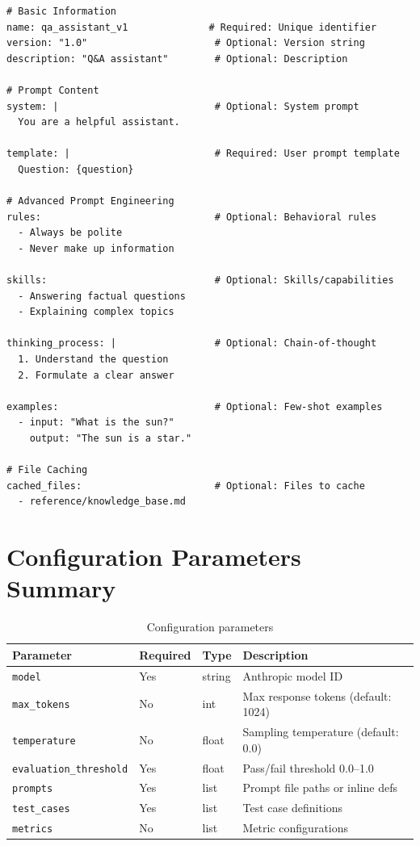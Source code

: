 \documentclass[11pt,a4paper]{report}
\begin{document}
\begin{lstlisting}[style=yaml,title={prompts/<name>.yaml}]
# Basic Information
name: qa_assistant_v1              # Required: Unique identifier
version: "1.0"                      # Optional: Version string
description: "Q&A assistant"        # Optional: Description

# Prompt Content
system: |                           # Optional: System prompt
  You are a helpful assistant.

template: |                         # Required: User prompt template
  Question: {question}

# Advanced Prompt Engineering
rules:                              # Optional: Behavioral rules
  - Always be polite
  - Never make up information

skills:                             # Optional: Skills/capabilities
  - Answering factual questions
  - Explaining complex topics

thinking_process: |                 # Optional: Chain-of-thought
  1. Understand the question
  2. Formulate a clear answer

examples:                           # Optional: Few-shot examples
  - input: "What is the sun?"
    output: "The sun is a star."

# File Caching
cached_files:                       # Optional: Files to cache
  - reference/knowledge_base.md
\end{lstlisting}

\section{Configuration Parameters Summary}

\begin{table}[h]
\centering
\begin{tabular}{@{}lllp{5cm}@{}}
\toprule
\textbf{Parameter} & \textbf{Required} & \textbf{Type} & \textbf{Description} \\
\midrule
\texttt{model} & Yes & string & Anthropic model ID \\
\texttt{max\_tokens} & No & int & Max response tokens (default: 1024) \\
\texttt{temperature} & No & float & Sampling temperature (default: 0.0) \\
\texttt{evaluation\_threshold} & Yes & float & Pass/fail threshold 0.0--1.0 \\
\texttt{prompts} & Yes & list & Prompt file paths or inline defs \\
\texttt{test\_cases} & Yes & list & Test case definitions \\
\texttt{metrics} & No & list & Metric configurations \\
\bottomrule
\end{tabular}
\caption{Configuration parameters}
\end{table}
\end{document}
